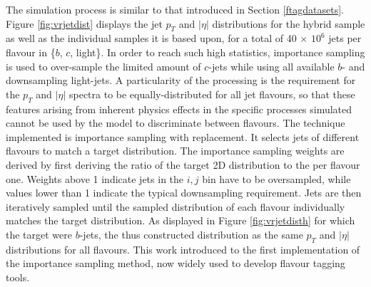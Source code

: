 The simulation process is similar to that introduced in Section \ref{ftagdatasets}. Figure \ref{fig:vrjetdist} displays the jet $p_T$ and $|\eta|$ distributions for the hybrid sample as well as the individual samples it is based upon, for a total of 40 $\times$ $10^6$ jets per flavour in \{$b$, $c$, light\}. In order to reach such high statistics, importance sampling is used to over-sample the limited amount of $c$-jets while using all available $b$- and downsampling light-jets. A particularity of the processing is the requirement for the $p_T$ and $|\eta|$ spectra to be equally-distributed for all jet flavours, so that these features arising from inherent physics effects in the specific processes simulated cannot be used by the model to discriminate between flavours. The technique implemented is importance sampling with replacement. It selects jets of different flavours to match a target distribution. The importance sampling weights are derived by first deriving the ratio of the target 2D distribution to the per flavour one. Weights above 1 indicate jets in the $i, j$ bin have to be oversampled, while values lower than 1 indicate the typical downsampling requirement. Jets are then iteratively sampled until the sampled distribution of each flavour individually matches the target distribution. As displayed in Figure \ref{fig:vrjetdisth} for which the target were $b$-jets, the thus constructed distribution as the same $p_T$ and $|\eta|$ distributions for all flavours. This work introduced to the first implementation of the importance sampling method, now widely used to develop flavour tagging tools.  

